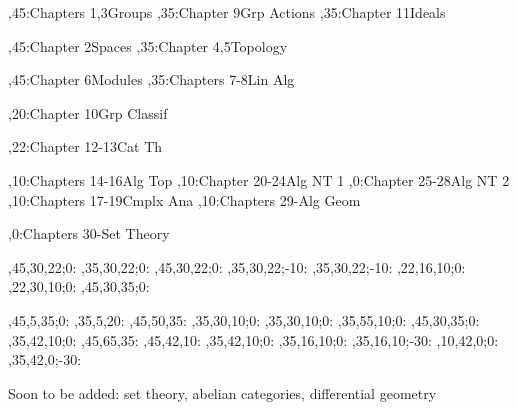 
\setcounter{diagheight}{50}
\begin{chart}
,45:{Chapters 1,3}{Groups}{}
,35:{Chapter 9}{Grp Actions}{}
,35:{Chapter 11}{Ideals}{}

,45:{Chapter 2}{Spaces}{}
,35:{Chapter 4,5}{Topology}{}

,45:{Chapter 6}{Modules}{}
,35:{Chapters 7-8}{Lin Alg}{}

,20:{Chapter 10}{Grp Classif}{}

,22:{Chapter 12-13}{Cat Th}{}

,10:{Chapters 14-16}{Alg Top}{}
,10:{Chapter 20-24}{Alg NT 1}{}
,0:{Chapter 25-28}{Alg NT 2}{}
,10:{Chapters 17-19}{Cmplx Ana}{}
,10:{Chapters 29-}{Alg Geom}{}

,0:{Chapters 30-}{Set Theory}{}

,45,30,22;0:   %
,35,30,22;0:   %
,45,30,22;0:   %
,35,30,22;-10: %
,35,30,22;-10: %
,22,16,10;0:   %
,22,30,10;0:   %
,45,30,35;0:   %

,45,5,35;0:    %
,35,5,20:      %
,45,50,35:     %
,35,30,10;0:   %
,35,30,10;0:   %
,35,55,10;0:   %
,45,30,35;0:   %
,35,42,10;0:   %
,45,65,35:     %
,45,42,10:     %
,35,42,10;0:   %
,35,16,10;0:   %
,35,16,10;-30: %
,10,42,0;0:    %
,35,42,0;-30:  %
\end{chart}

Soon to be added: set theory, abelian categories, differential geometry
